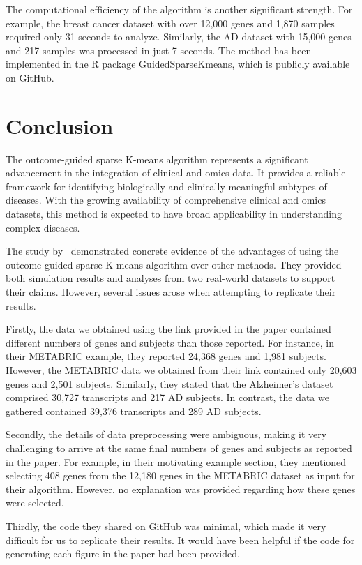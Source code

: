 \documentclass{statsoc}
\begin{document}
The computational efficiency of the algorithm is another significant strength. For example, the breast cancer dataset with over 12,000 genes and 1,870 samples required only 31 seconds to analyze. Similarly, the AD dataset with 15,000 genes and 217 samples was processed in just 7 seconds. The method has been implemented in the R package GuidedSparseKmeans, which is publicly available on GitHub.

\section{Conclusion}

The outcome-guided sparse K-means algorithm represents a significant advancement in the integration of clinical and omics data. It provides a reliable framework for identifying biologically and clinically meaningful subtypes of diseases. With the growing availability of comprehensive clinical and omics datasets, this method is expected to have broad applicability in understanding complex diseases.

The study by~\cite{meng2022outcome} demonstrated concrete evidence of the advantages of using the outcome-guided sparse K-means algorithm over other methods. They provided both simulation results and analyses from two real-world datasets to support their claims. However, several issues arose when attempting to replicate their results.

Firstly, the data we obtained using the link provided in the paper contained different numbers of genes and subjects than those reported. For instance, in their METABRIC example, they reported 24,368 genes and 1,981 subjects. However, the METABRIC data we obtained from their link contained only 20,603 genes and 2,501 subjects. Similarly, they stated that the Alzheimer’s dataset comprised 30,727 transcripts and 217 AD subjects. In contrast, the data we gathered contained 39,376 transcripts and 289 AD subjects.

Secondly, the details of data preprocessing were ambiguous, making it very challenging to arrive at the same final numbers of genes and subjects as reported in the paper. For example, in their motivating example section, they mentioned selecting 408 genes from the 12,180 genes in the METABRIC dataset as input for their algorithm. However, no explanation was provided regarding how these genes were selected.

Thirdly, the code they shared on GitHub was minimal, which made it very difficult for us to replicate their results. It would have been helpful if the code for generating each figure in the paper had been provided.
\end{document}
